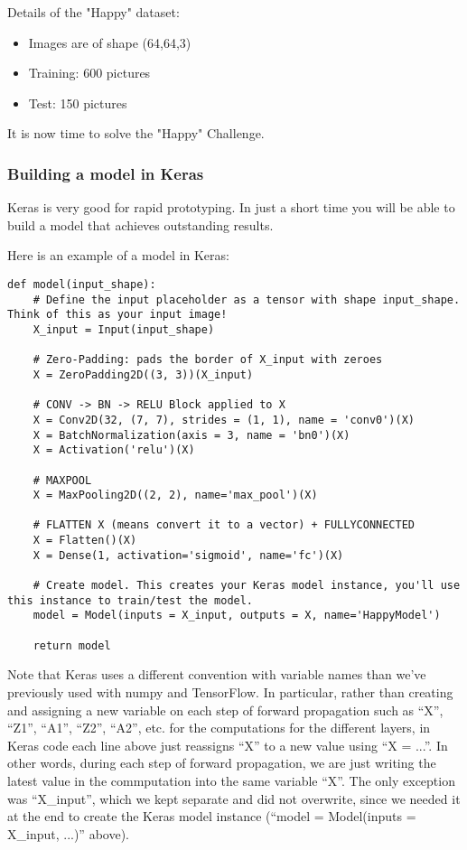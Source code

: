 Details of the "Happy" dataset:
\begin{itemize}
\item Images are of shape (64,64,3)
\item Training: 600 pictures
\item Test: 150 pictures
\end{itemize}

It is now time to solve the "Happy" Challenge.



\subsubsection{Building a model in Keras}

Keras is very good for rapid prototyping. In just a short time you will be able to build a model that achieves outstanding results.

Here is an example of a model in Keras:

\begin{verbatim}
def model(input_shape):
    # Define the input placeholder as a tensor with shape input_shape. Think of this as your input image!
    X_input = Input(input_shape)

    # Zero-Padding: pads the border of X_input with zeroes
    X = ZeroPadding2D((3, 3))(X_input)

    # CONV -> BN -> RELU Block applied to X
    X = Conv2D(32, (7, 7), strides = (1, 1), name = 'conv0')(X)
    X = BatchNormalization(axis = 3, name = 'bn0')(X)
    X = Activation('relu')(X)

    # MAXPOOL
    X = MaxPooling2D((2, 2), name='max_pool')(X)

    # FLATTEN X (means convert it to a vector) + FULLYCONNECTED
    X = Flatten()(X)
    X = Dense(1, activation='sigmoid', name='fc')(X)

    # Create model. This creates your Keras model instance, you'll use this instance to train/test the model.
    model = Model(inputs = X_input, outputs = X, name='HappyModel')

    return model
\end{verbatim}

Note that Keras uses a different convention with variable names than we've previously used with numpy and TensorFlow. In particular, rather than creating and assigning a new variable on each step of forward propagation such as ``X'', ``Z1'', ``A1'', ``Z2'', ``A2'', etc. for the computations for the different layers, in Keras code each line above just reassigns ``X'' to a new value using ``X = ...''. In other words, during each step of forward propagation, we are just writing the latest value in the commputation into the same variable ``X''. The only exception was ``X\_input'', which we kept separate and did not overwrite, since we needed it at the end to create the Keras model instance (``model = Model(inputs = X\_input, ...)'' above). 

